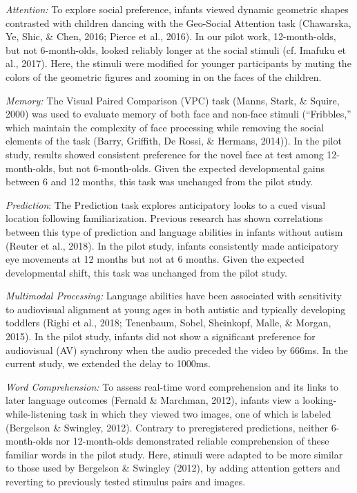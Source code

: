 \documentclass[
  english,
  man,floatsintext]{apa6}
\begin{document}
\emph{Attention:} To explore social preference, infants viewed dynamic geometric shapes contrasted with children dancing with the Geo-Social Attention task (Chawarska, Ye, Shic, \& Chen, 2016; Pierce et al., 2016).
In our pilot work, 12-month-olds, but not 6-month-olds, looked reliably longer at the social stimuli (cf. Imafuku et al., 2017).
Here, the stimuli were modified for younger participants by muting the colors of the geometric figures and zooming in on the faces of the children.

\emph{Memory:} The Visual Paired Comparison (VPC) task (Manns, Stark, \& Squire, 2000) was used to evaluate memory of both face and non-face stimuli (``Fribbles,'' which maintain the complexity of face processing while removing the social elements of the task (Barry, Griffith, De Rossi, \& Hermans, 2014)).
In the pilot study, results showed consistent preference for the novel face at test among 12-month-olds, but not 6-month-olds.
Given the expected developmental gains between 6 and 12 months, this task was unchanged from the pilot study.

\emph{Prediction}: The Prediction task explores anticipatory looks to a cued visual location following familiarization.
Previous research has shown correlations between this type of prediction and language abilities in infants without autism (Reuter et al., 2018).
In the pilot study, infants consistently made anticipatory eye movements at 12 months but not at 6 months.
Given the expected developmental shift, this task was unchanged from the pilot study.

\emph{Multimodal Processing:} Language abilities have been associated with sensitivity to audiovisual alignment at young ages in both autistic and typically developing toddlers (Righi et al., 2018; Tenenbaum, Sobel, Sheinkopf, Malle, \& Morgan, 2015).
In the pilot study, infants did not show a significant preference for audiovisual (AV) synchrony when the audio preceded the video by 666ms.
In the current study, we extended the delay to 1000ms.

\emph{Word Comprehension:} To assess real-time word comprehension and its links to later language outcomes (Fernald \& Marchman, 2012), infants view a looking-while-listening task in which they viewed two images, one of which is labeled (Bergelson \& Swingley, 2012).
Contrary to preregistered predictions, neither 6-month-olds nor 12-month-olds demonstrated reliable comprehension of these familiar words in the pilot study.
Here, stimuli were adapted to be more similar to those used by Bergelson \& Swingley (2012), by adding attention getters and reverting to previously tested stimulus pairs and images.
\end{document}
